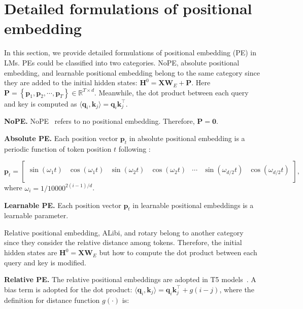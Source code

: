 \newpage
\section{Detailed formulations of positional embedding}\label{appendix_llm}

In this section, we provide detailed formulations of positional embedding (PE) in LMs. PEs could be classified into two categories. NoPE, absolute positional embedding, and learnable positional embedding belong to the same category since they are added to the initial hidden states: $\boldsymbol{H}^0=\boldsymbol{X}\boldsymbol{W}_E+\boldsymbol{P}$. Here $\boldsymbol{P}=\left\{\boldsymbol{p}_1\textrm{,}\,\boldsymbol{p}_2\textrm{,}\,\cdots\textrm{,}\,\boldsymbol{p}_T\right\}\in\mathbb{R}^{T\times d}$. Meanwhile, the dot product between each query and key is computed as  $\langle\boldsymbol{q}_i\textrm{,}\,\boldsymbol{k}_j\rangle=\boldsymbol{q}_i\boldsymbol{k}_j^\top$.


\textbf{NoPE.} NoPE~\citep{kazemnejad2024impact} refers to no positional embedding. Therefore, $\boldsymbol{P}=\boldsymbol{0}$.


\textbf{Absolute PE.} Each position vector $\boldsymbol{p}_t$ in absolute positional embedding is a periodic function of token position $t$ following \citet{vaswani2017attention}:

\begin{equation}
    \boldsymbol{p}_t=\begin{bmatrix}
        \sin(\omega_1 t) & \cos(\omega_1 t)  & \sin(\omega_2 t) & \cos(\omega_2 t) & \cdots & \sin(\omega_{d/2} t)& \cos(\omega_{d/2} t)\\
    \end{bmatrix}\textrm{,}
\end{equation}
where $\omega_i=1/\textrm{10000}^{2(i-1)/d}$. 

\textbf{Learnable PE.} Each position vector $\boldsymbol{p}_t$ in learnable positional embeddings is a learnable parameter.

Relative positional embedding, ALibi, and rotary belong to another category since they consider the relative distance among tokens. Therefore, the initial hidden states are $\boldsymbol{H}^0=\boldsymbol{X}\boldsymbol{W}_E$ but how to compute the dot product between each query and key is modified. 

\textbf{Relative PE.} The relative positional embeddings are adopted in T5 models~\citep{raffel2020exploring}. A bias term is adopted for the dot product: $\langle\boldsymbol{q}_i\textrm{,}\,\boldsymbol{k}_j\rangle=\boldsymbol{q}_i\boldsymbol{k}_j^\top+g(i-j)$, where the definition for distance function $g(\cdot)$ is:

